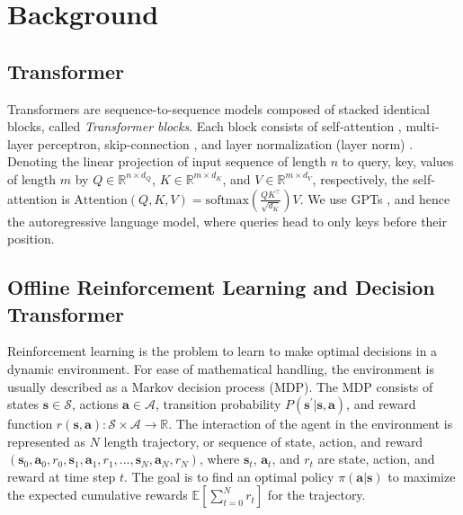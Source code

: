 \section{Background}
\label{section:background}

\subsection{Transformer}
\label{subsection:transformer}
Transformers are sequence-to-sequence models composed of stacked identical blocks, called \textit{Transformer blocks}. Each block consists of self-attention \cite{vaswani2017attention}, multi-layer perceptron, skip-connection \cite{he2016deep}, and layer normalization (layer norm) \cite{ba2016layer}. Denoting the linear projection of input sequence of length $n$ to query, key, values of length $m$ by $Q \in \mathbb{R}^{n \times d_Q}$, $K \in \mathbb{R}^{m \times d_K}$, and $V \in \mathbb{R}^{m \times d_V}$, respectively, the self-attention is $\text{Attention}(Q, K, V) = \text{softmax}\left( \frac{QK^{\top}}{\sqrt{d_K}} \right) V$. We use GPTs \cite{radford2018improving}, and hence the autoregressive language model, where queries head to only keys before their position.

\subsection{Offline Reinforcement Learning and Decision Transformer}
\label{subsection:decision-transformer}
Reinforcement learning is the problem to learn to make optimal decisions in a dynamic environment. For ease of mathematical handling, the environment is usually described as a Markov decision process (MDP). The MDP consists of states $\bm{s} \in \mathcal{S}$, actions $\bm{a} \in \mathcal{A}$, transition probability $P(\bm{s}^{\prime}|\bm{s}, \bm{a})$, and reward function $r(\bm{s}, \bm{a}): \mathcal{S} \times \mathcal{A} \to \mathbb{R}$. The interaction of the agent in the environment is represented as $N$ length trajectory, or sequence of state, action, and reward $(\bm{s}_0, \bm{a}_0, r_0, \bm{s}_1, \bm{a}_1, r_1, ..., \bm{s}_N, \bm{a}_N, r_N)$, where $\bm{s}_t$, $\bm{a}_t$, and $r_t$ are state, action, and reward at time step $t$. The goal is to find an optimal policy $\pi(\bm{a}|\bm{s})$ to maximize the expected cumulative rewards $\mathbb{E}[\sum_{t=0}^Nr_t]$ 
for the trajectory.

